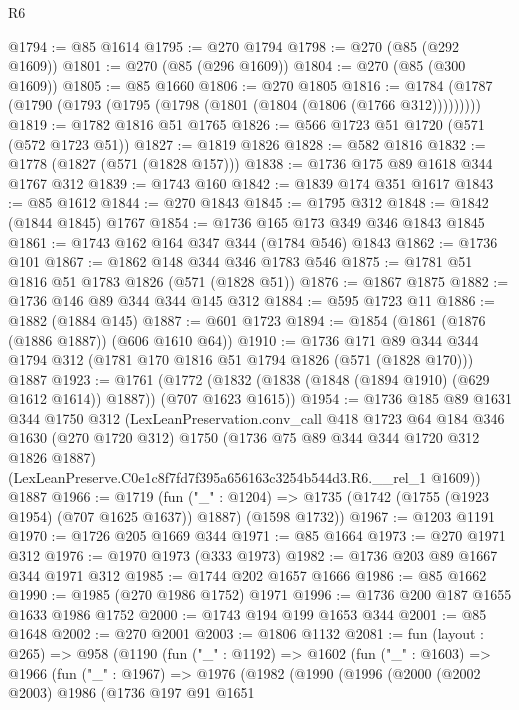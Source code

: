 \begin{lexlean}{R6}
\begin{coremodule}
@1794 := @85 @1614
@1795 := @270 @1794
@1798 := @270 (@85 (@292 @1609))
@1801 := @270 (@85 (@296 @1609))
@1804 := @270 (@85 (@300 @1609))
@1805 := @85 @1660
@1806 := @270 @1805
@1816 := @1784 (@1787 (@1790 (@1793 (@1795 (@1798 (@1801 (@1804 (@1806 (@1766 @312)))))))))
@1819 := @1782 @1816 @51 @1765
@1826 := @566 @1723 @51 @1720 (@571 (@572 @1723 @51))
@1827 := @1819 @1826
@1828 := @582 @1816
@1832 := @1778 (@1827 (@571 (@1828 @157)))
@1838 := @1736 @175 @89 @1618 @344 @1767 @312
@1839 := @1743 @160
@1842 := @1839 @174 @351 @1617
@1843 := @85 @1612
@1844 := @270 @1843
@1845 := @1795 @312
@1848 := @1842 (@1844 @1845) @1767
@1854 := @1736 @165 @173 @349 @346 @1843 @1845
@1861 := @1743 @162 @164 @347 @344 (@1784 @546) @1843
@1862 := @1736 @101
@1867 := @1862 @148 @344 @346 @1783 @546
@1875 := @1781 @51 @1816 @51 @1783 @1826 (@571 (@1828 @51))
@1876 := @1867 @1875
@1882 := @1736 @146 @89 @344 @344 @145 @312
@1884 := @595 @1723 @11
@1886 := @1882 (@1884 @145)
@1887 := @601 @1723
@1894 := @1854 (@1861 (@1876 (@1886 @1887)) (@606 @1610 @64))
@1910 := @1736
    @171
    @89
    @344
    @344
    @1794
    @312
    (@1781 @170 @1816 @51 @1794 @1826 (@571 (@1828 @170)))
    @1887
@1923 := @1761
    (@1772 (@1832 (@1838 (@1848 (@1894 @1910) (@629 @1612 @1614)) @1887)) (@707 @1623 @1615))
@1954 := @1736
    @185
    @89
    @1631
    @344
    @1750
    @312
    (LexLeanPreservation.conv_call
      @418
      @1723
      @64
      @184
      @346
      @1630
      (@270 @1720 @312)
      @1750
      (@1736 @75 @89 @344 @344 @1720 @312 @1826 @1887)
      (LexLeanPreserve.C0e1c8f7fd7f395a656163c3254b544d3.R6.__rel_1 @1609))
    @1887
@1966 := @1719
    (fun ("_" : @1204) =>
    @1735 (@1742 (@1755 (@1923 @1954) (@707 @1625 @1637)) @1887) (@1598 @1732))
@1967 := @1203 @1191
@1970 := @1726 @205 @1669 @344
@1971 := @85 @1664
@1973 := @270 @1971 @312
@1976 := @1970 @1973 (@333 @1973)
@1982 := @1736 @203 @89 @1667 @344 @1971 @312
@1985 := @1744 @202 @1657 @1666
@1986 := @85 @1662
@1990 := @1985 (@270 @1986 @1752) @1971
@1996 := @1736 @200 @187 @1655 @1633 @1986 @1752
@2000 := @1743 @194 @199 @1653 @344
@2001 := @85 @1648
@2002 := @270 @2001
@2003 := @1806 @1132
@2081 := fun (layout : @265) =>
  @958
    (@1190
      (fun ("_" : @1192) =>
      @1602
        (fun ("_" : @1603) =>
        @1966
          (fun ("_" : @1967) =>
          @1976
            (@1982
              (@1990
                (@1996
                  (@2000
                    (@2002 @2003)
                    @1986
                    (@1736
                      @197
                      @91
                      @1651

\end{coremodule}
\end{lexlean}
